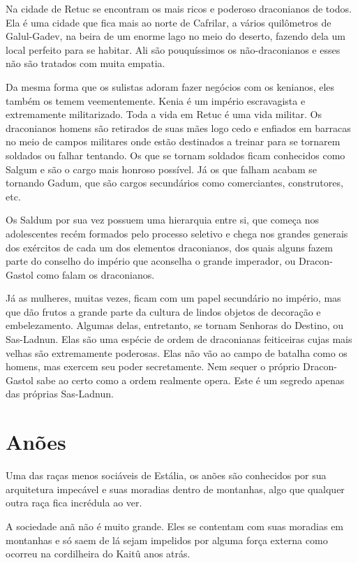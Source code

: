 \documentclass{RPG_Adventure}[2021/10/20]
\begin{document}
\begin{multicols}{2}
Na cidade de Retuc se encontram os mais ricos e poderoso draconianos de todos.
Ela é uma cidade que fica mais ao norte de Cafrilar, a vários quilômetros de
Galul-Gadev, na beira de um enorme lago no meio do deserto, fazendo dela um
local perfeito para se habitar. Ali são pouquíssimos os não-draconianos e esses
não são tratados com muita empatia.

Da mesma forma que os sulistas adoram fazer negócios com os kenianos, eles
também os temem veementemente. Kenia é um império escravagista e extremamente
militarizado. Toda a vida em Retuc é uma vida militar. Os draconianos homens são
retirados de suas mães logo cedo e enfiados em barracas no meio de campos
militares onde estão destinados a treinar para se tornarem soldados ou falhar
tentando. Os que se tornam soldados ficam conhecidos como Salgum e são o cargo
mais honroso possível. Já os que falham acabam se tornando Gadum, que são cargos
secundários como comerciantes, construtores, etc.

Os Saldum por sua vez possuem uma hierarquia entre si, que começa nos
adolescentes recém formados pelo processo seletivo e chega nos grandes generais
dos exércitos de cada um dos elementos draconianos, dos quais alguns fazem parte
do conselho do império que aconselha o grande imperador, ou Dracon-Gastol como
falam os draconianos.

Já as mulheres, muitas vezes, ficam com um papel secundário no império, mas que
dão frutos a grande parte da cultura de lindos objetos de decoração e
embelezamento. Algumas delas, entretanto, se tornam Senhoras do Destino, ou
Sas-Ladnun. Elas são uma espécie de ordem de draconianas feiticeiras cujas mais
velhas são extremamente poderosas. Elas não vão ao campo de batalha como os
homens, mas exercem seu poder secretamente. Nem sequer o próprio Dracon-Gastol
sabe ao certo como a ordem realmente opera. Este é um segredo apenas das
próprias Sas-Ladnun.

\section{Anões}%

Uma das raças menos sociáveis de Estália, os anões são conhecidos por sua
arquitetura impecável e suas moradias dentro de montanhas, algo que qualquer
outra raça fica incrédula ao ver.

A sociedade anã não é muito grande. Eles se contentam com suas moradias em
montanhas e só saem de lá sejam impelidos por alguma força externa como ocorreu
na cordilheira do Kaitû anos atrás.


\end{multicols}
\end{document}
